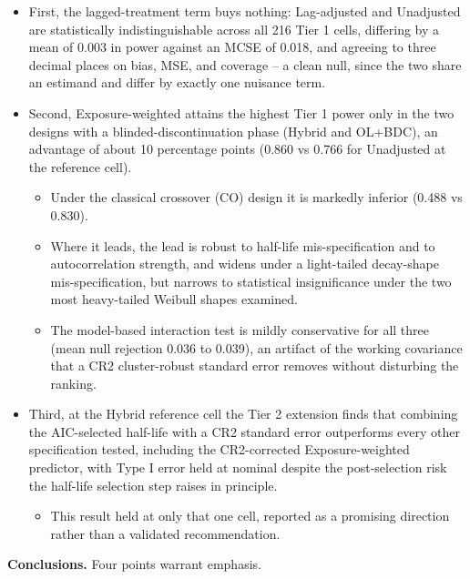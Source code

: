 \documentclass[
  11pt,
]{article}
\providecommand{\tightlist}{%
  \setlength{\itemsep}{0pt}\setlength{\parskip}{0pt}}
\begin{document}
\begin{itemize}
\tightlist
\item
  First, the lagged-treatment term buys nothing: Lag-adjusted and
  Unadjusted are statistically indistinguishable across all 216 Tier
  1 cells, differing by a mean of 0.003 in power against an MCSE of
  0.018, and agreeing to three decimal places on bias, MSE, and
  coverage -- a clean null, since the two share an estimand and differ
  by exactly one nuisance term.
\item
  Second, Exposure-weighted attains the highest Tier 1 power only in
  the two designs with a blinded-discontinuation phase (Hybrid and
  OL+BDC), an advantage of about 10 percentage points (0.860 vs 0.766
  for Unadjusted at the reference cell).

  \begin{itemize}
  \tightlist
  \item
    Under the classical crossover (CO) design it is markedly inferior
    (0.488 vs 0.830).
  \item
    Where it leads, the lead is robust to half-life mis-specification
    and to autocorrelation strength, and widens under a light-tailed
    decay-shape mis-specification, but narrows to statistical
    insignificance under the two most heavy-tailed Weibull shapes
    examined.
  \item
    The model-based interaction test is mildly conservative for all
    three (mean null rejection 0.036 to 0.039), an artifact of the
    working covariance that a CR2 cluster-robust standard error
    removes without disturbing the ranking.
  \end{itemize}
\item
  Third, at the Hybrid reference cell the Tier 2 extension finds that
  combining the AIC-selected half-life with a CR2 standard error
  outperforms every other specification tested, including the
  CR2-corrected Exposure-weighted predictor, with Type I error held
  at nominal despite the post-selection risk the half-life selection
  step raises in principle.

  \begin{itemize}
  \tightlist
  \item
    This result held at only that one cell, reported as a promising
    direction rather than a validated recommendation.
  \end{itemize}
\end{itemize}

\textbf{Conclusions.} Four points warrant emphasis.
\end{document}
